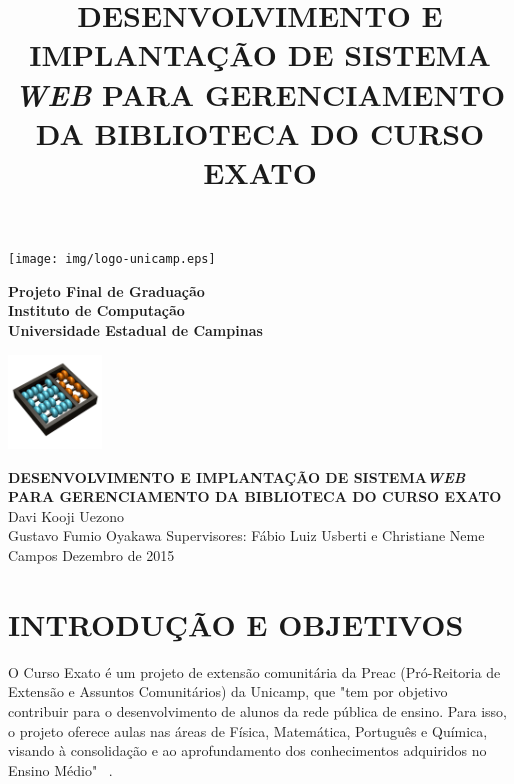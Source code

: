 \documentclass[a4paper]{article}
\title{DESENVOLVIMENTO E IMPLANTAÇÃO DE SISTEMA \textit{WEB} PARA GERENCIAMENTO DA BIBLIOTECA DO CURSO EXATO}
\begin{document}
\begin{minipage}[t|]{14mm}
\texttt{[image: img/logo-unicamp.eps]}
\end{minipage}
\hfill
\begin{minipage}[tl]{120mm}
\begin{center}
{\bf \sc Projeto Final de Graduação}\\
{\bf \sc Instituto de Computação} \\
{\bf \sc Universidade Estadual de Campinas} \\
\end{center}
\end{minipage}
\hfill
\begin{minipage}[c]{25mm}
\thispagestyle{empty}
\hspace{-0.5cm}
\includegraphics[width=25mm]{img/logo-ic.png}
\end{minipage}
\vfill\vfill
\begin{center}
\Huge{\textbf{DESENVOLVIMENTO E IMPLANTAÇÃO DE SISTEMA\textit{WEB} PARA GERENCIAMENTO DA BIBLIOTECA DO CURSO EXATO}}
\vfill\vfill
\huge{Davi Kooji Uezono\\Gustavo Fumio Oyakawa}
\vfill
\Large{Supervisores: Fábio Luiz Usberti e Christiane Neme Campos}
\vfill\vfill
\Large{Dezembro de 2015}
\end{center}
\vfill


\pagebreak
\setcounter{page}{1}
\section{INTRODUÇÃO E OBJETIVOS}

O Curso Exato é um projeto de extensão comunitária da Preac (Pró-Reitoria de Extensão e Assuntos Comunitários) da Unicamp, que "tem por objetivo contribuir para o desenvolvimento de alunos da rede pública de ensino. Para isso, o projeto oferece aulas nas áreas de Física, Matemática, Português e Química, visando à consolidação e ao aprofundamento dos conhecimentos adquiridos no Ensino Médio" \ \cite{cursoexato}.
\end{document}
